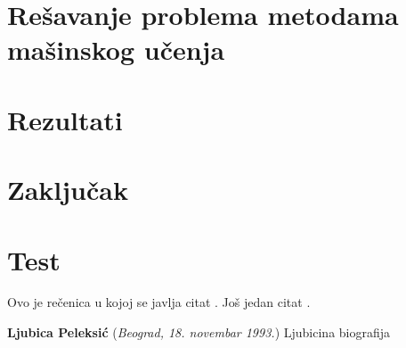 \documentclass[12pt,oneside]{memoir}
\begin{document}
\chapter{Rešavanje problema metodama mašinskog učenja}

\chapter{Rezultati}



\chapter{Zaključak}

\chapter{Test}

Ovo je rečenica u kojoj se javlja citat \cite{PetrovicMikic2015}.
Još jedan citat \cite{GuSh:243}.





% 
\literatura

\backmatter


\begin{biografija}
  \textbf{Ljubica Peleksić} (\emph{Beograd,
    18.  novembar 1993.}) 
	Ljubicina biografija
\end{biografija}
\end{document}
